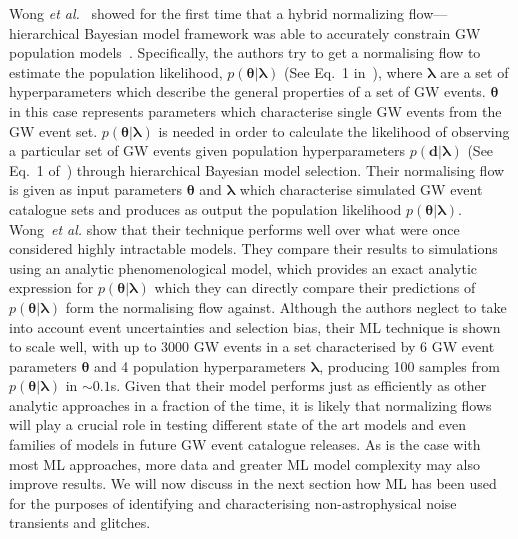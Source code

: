 %
%
Wong \textit{et al.}~\cite{PhysRevD.101.123005} showed for the 
first time that a hybrid normalizing flow---hierarchical Bayesian model 
framework was able to accurately 
constrain \ac{GW} population models~\cite{PhysRevD.101.123005}.
Specifically, the authors try to get a normalising flow to estimate 
the population likelihood, $p(\bm{\theta}|\bm{\lambda})$ (See Eq.~1 
in~\cite{PhysRevD.101.123005}), where $\bm{\lambda}$ 
are a set of hyperparameters which describe the general properties of
a set of \ac{GW} events. 
$\bm{\theta}$ in this case represents parameters 
which characterise single \ac{GW} events from the \ac{GW} event set. $p(\bm{\theta}|\bm{\lambda})$ is needed in order to calculate the 
likelihood of observing a particular set of \ac{GW} events
given population hyperparameters $p(\bm{d}|\bm{\lambda})$ (See Eq.~1 
of~\cite{PhysRevD.101.123005}) through 
hierarchical Bayesian model 
selection. 
Their normalising flow is given as input 
parameters $\bm{\theta}$ and $\bm{\lambda}$ 
which characterise simulated \ac{GW} event catalogue sets and produces 
as output the population likelihood $p(\bm{\theta}|\bm{\lambda})$. 
Wong~\textit{et al.} show that their technique performs well 
over what were once considered highly intractable models. They compare 
their results to simulations using an analytic phenomenological 
model, which provides an exact analytic expression for
$p(\bm{\theta}|\bm{\lambda})$ which they can directly compare their predictions
of $p(\bm{\theta}|\bm{\lambda})$ form the normalising flow against. 
Although the authors neglect to take into account event 
uncertainties and selection bias, their \ac{ML} technique 
is shown to scale well, with up to 3000 \ac{GW} events in a set 
characterised by 6 \ac{GW} event parameters $\bm{\theta}$ and 
4 population hyperparameters $\bm{\lambda}$, producing 100 samples from 
$p(\bm{\theta}|\bm{\lambda})$ in 
$\sim0.1$s. Given that their model performs just as efficiently 
as other analytic approaches in a fraction of the time, it is 
likely that normalizing flows will play a crucial role in testing 
different state of the art models and even families of models 
in future \ac{GW} event catalogue releases. As is the case with 
most \ac{ML} approaches, more data and greater \ac{ML} 
model complexity may also improve results. We will now 
discuss in the next section how \ac{ML} has been 
used for the purposes of identifying and characterising 
non-astrophysical noise transients and glitches.

